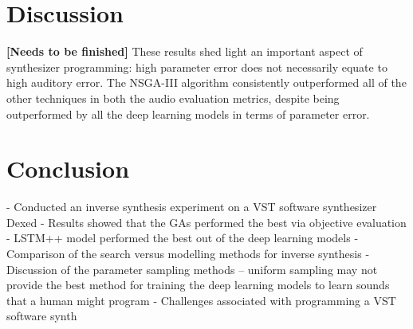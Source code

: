 \section{Discussion}
\label{sec:inverse-synth-discuss}

\textbf{[Needs to be finished]}
 These results shed light an important aspect of synthesizer programming: high parameter error does not necessarily equate to high auditory error. The NSGA-III algorithm consistently outperformed all of the other techniques in both the audio evaluation metrics, despite being outperformed by all the deep learning models in terms of parameter error. 


\section{Conclusion}

- Conducted an inverse synthesis experiment on a VST software synthesizer Dexed
- Results showed that the GAs performed the best via objective evaluation
- LSTM++ model performed the best out of the deep learning models
- Comparison of the search versus modelling methods for inverse synthesis
- Discussion of the parameter sampling methods -- uniform sampling may not provide the best method for training the deep learning models to learn sounds that a human might program
- Challenges associated with programming a VST software synth




